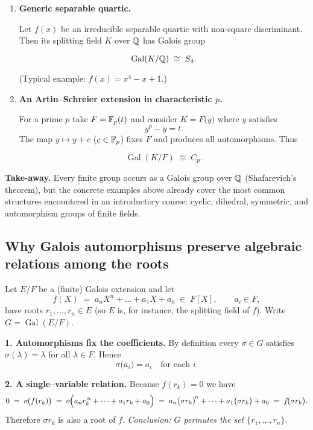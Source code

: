 \documentclass[12pt]{article}
\theoremstyle{definition} %
\theoremstyle{plain} %
\begin{document}
\begin{enumerate}
\item \textbf{Generic separable quartic.}

      Let $f(x)$ be an irreducible separable quartic with
      non-square discriminant.  
      Then its splitting field $K$ over $\Bbb Q$ has Galois group

      \[
         \operatorname{Gal}(K/\Bbb Q)\;\cong\;S_4.
      \]

      (Typical example: $f(x)=x^{4}-x+1$.)

\item \textbf{An Artin–Schreier extension in characteristic $p$.}

      For a prime $p$ take $F=\Bbb F_p(t)$ and 
      consider $K=F\bigl(y\bigr)$ where $y$ satisfies
      \[
         y^{p}-y = t.
      \]
      The map $y\mapsto y+c$ ($c\in\Bbb F_p$) fixes $F$ and produces
      all automorphisms.  Thus

      \[
         \operatorname{Gal}(K/F)\;\cong\;C_p.
      \]

\end{enumerate}

\bigskip
\noindent
\textbf{Take-away.}\;
Every finite group occurs as a Galois group over \(\Bbb Q\)
(Shafarevich’s theorem), but the concrete examples above already cover
the most common structures encountered in an introductory course:
cyclic, dihedral, symmetric, and automorphism groups of finite fields.
\subsection*{Why Galois automorphisms preserve algebraic relations among the roots}

Let \(E/F\) be a (finite) Galois extension and let  
\[
   f(X)\;=\;a_nX^n+\dots+a_1X+a_0\;\in\;F[X], 
   \qquad a_i\in F,
\]
have roots \(r_1,\dots,r_n\in E\) (so \(E\) is, for instance, the
splitting field of \(f\)).  
Write \(G=\operatorname{Gal}(E/F)\).

\bigskip
\textbf{1.  Automorphisms fix the coefficients.}\;
By definition every \(\sigma\in G\) satisfies \(\sigma(\lambda)=\lambda\)
for all \(\lambda\in F\).  Hence
\[
   \sigma\!\bigl(a_i\bigr)=a_i
   \quad\text{for each }i.
\]

\bigskip
\textbf{2.  A single–variable relation.}\;
Because \(f(r_k)=0\) we have
\[
   0
   \;=\;
   \sigma\!\bigl(f(r_k)\bigr)
   \;=\;
   \sigma\!\Bigl(a_n r_k^{\,n}
                 +\dots+a_1 r_k + a_0\Bigr)
   \;=\;
   a_n\bigl(\sigma r_k\bigr)^{\!n}
      +\dots+a_1\bigl(\sigma r_k\bigr)+a_0
   \;=\;
   f\!\bigl(\sigma r_k\bigr).
\]
Therefore \(\sigma r_k\) is also a root of \(f\).  
\emph{Conclusion: \(G\) permutes the set \(\{r_1,\dots,r_n\}\).}
\end{document}
